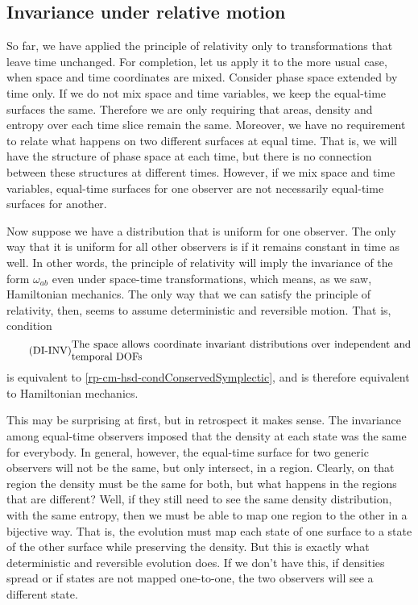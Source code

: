 \subsection{Invariance under relative motion}

So far, we have applied the principle of relativity only to transformations that leave time unchanged. For completion, let us apply it to the more usual case, when space and time coordinates are mixed. Consider phase space extended by time only. If we do not mix space and time variables, we keep the equal-time surfaces the same. Therefore we are only requiring that areas, density and entropy over each time slice remain the same. Moreover, we have no requirement to relate what happens on two different surfaces at equal time. That is, we will have the structure of phase space at each time, but there is no connection between these structures at different times. However, if we mix space and time variables, equal-time surfaces for one observer are not necessarily equal-time surfaces for another.

Now suppose we have a distribution that is uniform for one observer. The only way that it is uniform for all other observers is if it remains constant in time as well. In other words, the principle of relativity will imply the invariance of the form $\omega_{ab}$ even under space-time transformations, which means, as we saw, Hamiltonian mechanics. The only way that we can satisfy the principle of relativity, then, seems to assume deterministic and reversible motion. That is, condition
\begin{equation}\tag{DI-INV}\label{rp-cm-hmd-condInvariantDensityTime}
	\eqtext{The space allows coordinate invariant distributions over independent and temporal DOFs}
\end{equation}
is equivalent to \ref{rp-cm-hsd-condConservedSymplectic}, and is therefore equivalent to Hamiltonian mechanics.

This may be surprising at first, but in retrospect it makes sense. The invariance among equal-time observers imposed that the density at each state was the same for everybody. In general, however, the equal-time surface for two generic observers will not be the same, but only intersect, in a region. Clearly, on that region the density must be the same for both, but what happens in the regions that are different? Well, if they still need to see the same density distribution, with the same entropy, then we must be able to map one region to the other in a bijective way. That is, the evolution must map each state of one surface to a state of the other surface while preserving the density. But this is exactly what deterministic and reversible evolution does. If we don't have this, if densities spread or if states are not mapped one-to-one, the two observers will see a different state.


